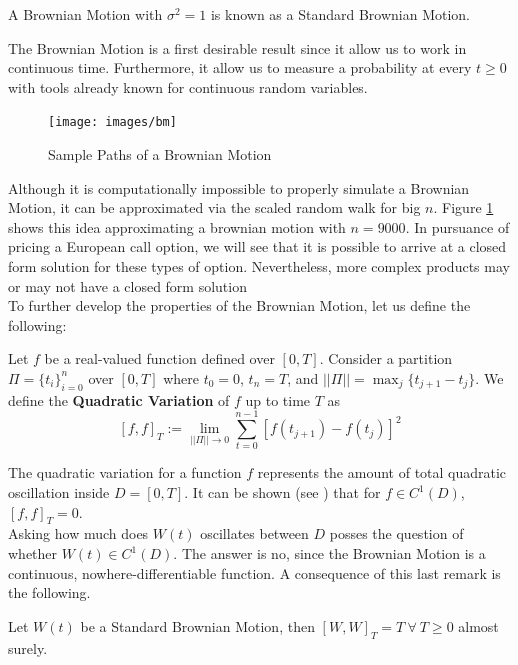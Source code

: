 \documentclass[../TGMAFFIRO]{subfiles}
\begin{document}
\begin{remark}
	A Brownian Motion with $\sigma^2 = 1$ is known as a Standard Brownian Motion.
\end{remark}

The Brownian Motion is a first desirable result since it allow us to work in continuous time. Furthermore, it allow us to measure a probability at every $t\geq 0$ with tools already known for continuous random variables. 

\begin{figure}[h]
	\centering
	\label{fig:Brownian_Motion}
	\texttt{[image: images/bm]}
	\caption{Sample Paths of a Brownian Motion}
\end{figure}

Although it is computationally impossible to properly simulate a Brownian Motion, it can be approximated via the scaled random walk for big $n$. Figure \ref{fig:Brownian_Motion} shows this idea approximating a brownian motion with $n=9000$. In pursuance of pricing a European call option, we will see that it is possible to arrive at a closed form solution for these types of option. Nevertheless, more complex products may or may not have a closed form solution\\

To further develop the properties of the Brownian Motion, let us define the following:
\begin{definition}\label{def:quadratic_variation}
	Let $f$ be a real-valued function defined over $[0, T]$. Consider a partition $\Pi= \{t_i\}_{i=0}^{n}$ over $[0, T]$ where $t_0 = 0$, $t_n = T$, and $||\Pi|| = \max_j\{t_{j+1} - t_j\}$. We define the \textbf{Quadratic Variation} of $f$ up to time $T$ as
	\[
		[f, f]_T := \lim_{||\Pi|| \to 0} \sum_{t=0}^{n-1}\left[f(t_{j+1}) - f(t_{j})\right]^2
	\]
\end{definition}


The quadratic variation for a function $f$ represents the amount of total quadratic oscillation inside $D = [0,T]$. It can be shown (see ) that for $f \in C^1(D)$, $[f,f]_T = 0$.\\
	
Asking how much does $W(t)$ oscillates between $D$ posses the question of whether $W(t) \in C^1(D)$. The answer is no, since the Brownian Motion is a continuous, nowhere-differentiable function. A consequence of this last remark is the following.

\begin{theorem}\label{th:quadratic_brownian_motion}
	Let $W(t)$ be a Standard Brownian Motion, then $[W, W]_T = T \ \forall \ T \geq 0$ almost surely.
\end{theorem}
\end{document}
